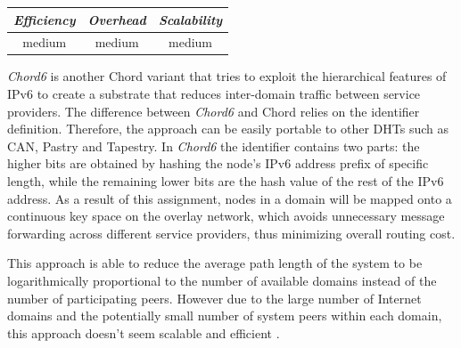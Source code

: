 \begin{center}
\begin{tabular}{ccc}
\emph{Efficiency} & \emph{Overhead} & \emph{Scalability} \\
\hline
medium &
medium &
medium
\end{tabular}
\end{center}

\emph{Chord6} \cite{XZHL2005} is another Chord variant that tries to
exploit the hierarchical features of IPv6 to create a substrate that
reduces inter-domain traffic between service providers. The difference between
\emph{Chord6} and Chord relies on the identifier definition. Therefore, the approach
can be easily portable to other DHTs such as CAN, Pastry and Tapestry. In \emph{Chord6}
the identifier contains two parts: the higher bits are obtained by hashing the
node's IPv6 address prefix of specific length, while the remaining lower bits
are the hash value of the rest of the IPv6 address. As a result of this
assignment, nodes in a domain will be mapped onto a continuous key space on the
overlay network, which avoids unnecessary message forwarding across different
service providers, thus minimizing overall routing cost.

This approach is able to reduce the average path length of the system to be
logarithmically proportional to the number of available domains instead of the
number of participating peers. However due to the large number of Internet
domains and the potentially small number of system peers within each domain,
this approach doesn't seem scalable and efficient \cite{DK2006}.


